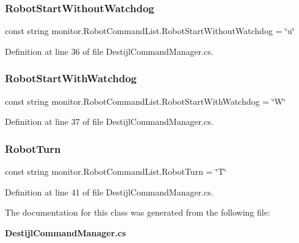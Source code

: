 \subsubsection{Robot\+Start\+Without\+Watchdog}
{\footnotesize\ttfamily const string monitor.\+Robot\+Command\+List.\+Robot\+Start\+Without\+Watchdog = \char`\"{}u\char`\"{}}



Definition at line 36 of file Destijl\+Command\+Manager.\+cs.

\mbox{\label{classmonitor_1_1_robot_command_list_aafa5d0e5fec3afe6586cca8b88d45c85}} 
\subsubsection{Robot\+Start\+With\+Watchdog}
{\footnotesize\ttfamily const string monitor.\+Robot\+Command\+List.\+Robot\+Start\+With\+Watchdog = \char`\"{}W\char`\"{}}



Definition at line 37 of file Destijl\+Command\+Manager.\+cs.

\mbox{\label{classmonitor_1_1_robot_command_list_a2b88fc42fba8229f163e03e7252a77e6}} 
\subsubsection{Robot\+Turn}
{\footnotesize\ttfamily const string monitor.\+Robot\+Command\+List.\+Robot\+Turn = \char`\"{}T\char`\"{}}



Definition at line 41 of file Destijl\+Command\+Manager.\+cs.



The documentation for this class was generated from the following file\+:\begin{DoxyCompactItemize}
\item 
\textbf{ Destijl\+Command\+Manager.\+cs}\end{DoxyCompactItemize}
